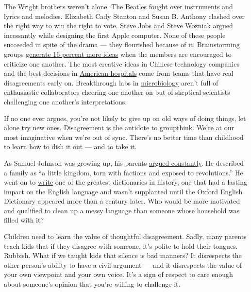 The Wright brothers weren't alone. The Beatles fought over instruments
and lyrics and melodies. Elizabeth Cady Stanton and Susan B. Anthony
clashed over the right way to win the right to vote. Steve Jobs and
Steve Wozniak argued incessantly while designing the first Apple
computer. None of these people succeeded in spite of the drama --- they
flourished because of it. Brainstorming groups
\href{http://onlinelibrary.wiley.com/doi/10.1002/ejsp.210/full}{generate
16 percent more ideas} when the members are encouraged to criticize one
another. The most creative ideas in Chinese technology companies and the
best decisions in
\href{http://amj.aom.org/content/42/4/389.short}{American hospitals}
come from teams that have real disagreements early on. Breakthrough labs
in
\href{http://citeseerx.ist.psu.edu/viewdoc/summary?doi=10.1.1.110.5562}{microbiology}
aren't full of enthusiastic collaborators cheering one another on but of
skeptical scientists challenging one another's interpretations.

If no one ever argues, you're not likely to give up on old ways of doing
things, let alone try new ones. Disagreement is the antidote to
groupthink. We're at our most imaginative when we're out of sync.
There's no better time than childhood to learn how to dish it out ---
and to take it.

As Samuel Johnson was growing up, his parents
\href{https://books.google.com/books?id=bMlDB2Cor1EC\&pg=PT49\&dq=biography+\%22parents+argued+constantly\%22\&hl=en\&sa=X\&ved=0ahUKEwi07omCpvfUAhXCrD4KHWodDaEQ6AEIJjAA\#v=snippet\&q=argued\&f=false}{argued
constantly}. He described a family as ``a little kingdom, torn with
factions and exposed to revolutions.'' He went on to
\href{https://www.neh.gov/humanities/2009/septemberoctober/feature/what-samuel-johnson-really-did}{write}
one of the greatest dictionaries in history, one that had a lasting
impact on the English language and wasn't supplanted until the Oxford
English Dictionary appeared more than a century later. Who would be more
motivated and qualified to clean up a messy language than someone whose
household was filled with it?

Children need to learn the value of thoughtful disagreement. Sadly, many
parents teach kids that if they disagree with someone, it's polite to
hold their tongues. Rubbish. What if we taught kids that silence is bad
manners? It disrespects the other person's ability to have a civil
argument --- and it disrespects the value of your own viewpoint and your
own voice. It's a sign of respect to care enough about someone's opinion
that you're willing to challenge it.

